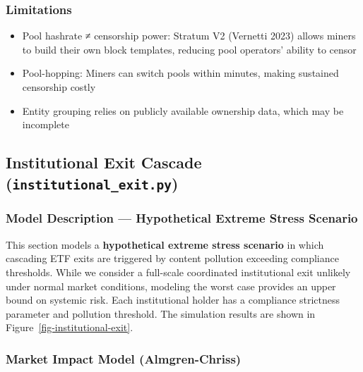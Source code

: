 \documentclass[
  11pt,
]{article}
\providecommand{\tightlist}{%
  \setlength{\itemsep}{0pt}\setlength{\parskip}{0pt}}\usepackage{longtable,booktabs,array}
\let\oldsubsection\subsection
\renewcommand{\subsection}[1]{\FloatBarrier\oldsubsection{#1}}
\begin{document}
\hypertarget{limitations}{%
\subsubsection{Limitations}\label{limitations}}

\begin{itemize}
\tightlist
\item
  Pool hashrate ≠ censorship power: Stratum V2 (Vernetti 2023) allows
  miners to build their own block templates, reducing pool operators'
  ability to censor
\item
  Pool-hopping: Miners can switch pools within minutes, making sustained
  censorship costly
\item
  Entity grouping relies on publicly available ownership data, which may
  be incomplete
\end{itemize}

\hypertarget{institutional-exit-cascade-institutional_exit.py}{%
\subsection{\texorpdfstring{Institutional Exit Cascade
(\texttt{institutional\_exit.py})}{Institutional Exit Cascade (institutional\_exit.py)}}\label{institutional-exit-cascade-institutional_exit.py}}

\hypertarget{model-description-hypothetical-extreme-stress-scenario}{%
\subsubsection{Model Description --- Hypothetical Extreme Stress
Scenario}\label{model-description-hypothetical-extreme-stress-scenario}}

This section models a \textbf{hypothetical extreme stress scenario} in
which cascading ETF exits are triggered by content pollution exceeding
compliance thresholds. While we consider a full-scale coordinated
institutional exit unlikely under normal market conditions, modeling the
worst case provides an upper bound on systemic risk. Each institutional
holder has a compliance strictness parameter and pollution threshold.
The simulation results are shown in Figure~\ref{fig-institutional-exit}.

\hypertarget{market-impact-model-almgren-chriss}{%
\subsubsection{Market Impact Model
(Almgren-Chriss)}\label{market-impact-model-almgren-chriss}}
\end{document}
